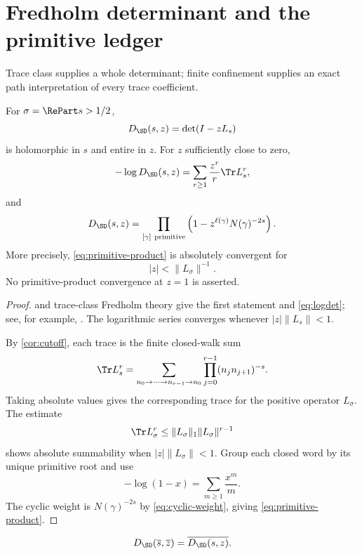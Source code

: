 \section{Fredholm determinant and the primitive ledger}
\label{sec:fredholm}

Trace class supplies a whole determinant; finite confinement supplies an
exact path interpretation of every trace coefficient.

\begin{theorem}
\label{thm:fredholm}
For \(\sigma=\RePart s>1/2\),
\[
 D_{\SD}(s,z)=\det(I-zL_s)
\]
is holomorphic in \(s\) and entire in \(z\).  For \(z\) sufficiently close
to zero,
\begin{equation}
\label{eq:logdet}
 -\log D_{\SD}(s,z)
 =
 \sum_{r\ge1}\frac{z^r}{r}\Tr L_s^r,
\end{equation}
and
\begin{equation}
\label{eq:primitive-product}
 D_{\SD}(s,z)
 =
 \prod_{[\gamma]\ {\rm primitive}}
 \left(
 1-z^{\ell(\gamma)}N(\gamma)^{-2s}
 \right).
\end{equation}
More precisely, \cref{eq:primitive-product} is absolutely convergent for
\[
 |z|<\|L_{\sigma}\|^{-1}.
\]
No primitive-product convergence at \(z=1\) is asserted.
\end{theorem}

\begin{proof}
 and trace-class Fredholm theory give
the first statement and \cref{eq:logdet}; see, for example,
\citet{Simon1977}.  The logarithmic series converges whenever
\(|z|\|L_s\|<1\).

By \cref{cor:cutoff}, each trace is the finite closed-walk sum
\[
 \Tr L_s^r
 =
 \sum_{n_0\to\cdots\to n_{r-1}\to n_0}
 \prod_{j=0}^{r-1}(n_jn_{j+1})^{-s}.
\]
Taking absolute values gives the corresponding trace for the positive
operator \(L_\sigma\).  The estimate
\[
 \Tr L_\sigma^r
 \le\|L_\sigma\|_1\|L_\sigma\|^{r-1}
\]
shows absolute summability when \(|z|\|L_\sigma\|<1\).
Group each closed word by its unique primitive root and use
\[
 -\log(1-x)=\sum_{m\ge1}\frac{x^m}{m}.
\]
The cyclic weight is \(N(\gamma)^{-2s}\) by
\cref{eq:cyclic-weight}, giving \cref{eq:primitive-product}.
\end{proof}

\begin{corollary}
\label{cor:conjugation}
\[
 D_{\SD}(\overline s,\overline z)
 =
 \overline{D_{\SD}(s,z)}.
\]
\end{corollary}

